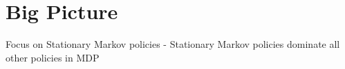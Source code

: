\section{Big Picture}

\begin{frame}{Focus on Stationary Markov policies}
    - Stationary Markov policies dominate all other policies in MDP
\end{frame}